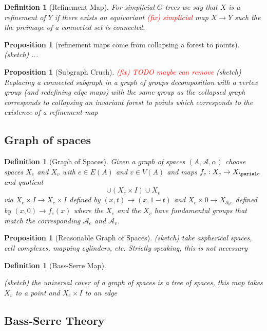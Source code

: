 \documentclass{article}
\newcommand{\fix}[1]{\textcolor{red}{(fix) #1}}
\theoremstyle{mystyle}
\newtheorem{pro}[thm]{Proposition}
\newtheorem{defn}[thm]{Definition}
\theoremstyle{remark}
\begin{document}
\begin{defn}
    [Refinement Map]
    For simplicial $G$-trees we say that $X$ is a refinement of $Y$ if there exists an  equivariant \fix{simplicial} map $X\to Y$ such the the preimage of a connected set is connected.
\end{defn}
\begin{pro}
    [refinement maps come from collapsing a forest to points]
    (sketch)
    ...
\end{pro}
\begin{pro}
    [Subgraph Crush]
    \fix{TODO maybe can remove}
    (sketch)
    Replacing a connected subgraph in a graph of groups decomposition with a vertex group (and redefining edge maps) with the same group as the collapsed graph corresponds to collapsing an invariant forest to points which corresponds to the existence of a refinement map
\end{pro}

\subsection{Graph of spaces}
\begin{defn}
    [Graph of Spaces]
    Given a graph of spaces $(A,\mathscr A, \alpha)$ choose spaces $X_e$ and $X_v$ with $e\in E(A)$ and $v\in V(A)$ and maps $f_e: X_e\to X_{\parial e}$ and quotient \[ \cup (X_e \times I) \cup X_v \] via  \(X_e \times I \to X_{\bar{e}} \times I\) defined by \((x,t)\to(x,1-t)\) and \(X_e\times 0\to X_{\partial_0 e}\) defined by \( (x,0)\to f_e(x)\) where the $X_e$ and the $X_v$ have fundamental groups that match the corresponding $\mathscr A_e$ and $\mathscr A_v$.
\end{defn}

\begin{pro}
    [Reasonable Graph of Spaces]
    (sketch) take aspherical spaces, cell complexes, mapping cylinders, etc. Strictly speaking, this is not necessary 
\end{pro}
    
\begin{defn}
    [Bass-Serre Map]
    \label{defn:bsmap}
    
    (sketch)
    the universal cover of a graph of spaces is a tree of spaces, this map takes $X_v$ to a point and $X_e \times I$ to an edge
\end{defn}
\subsection{Bass-Serre Theory}
\end{document}
